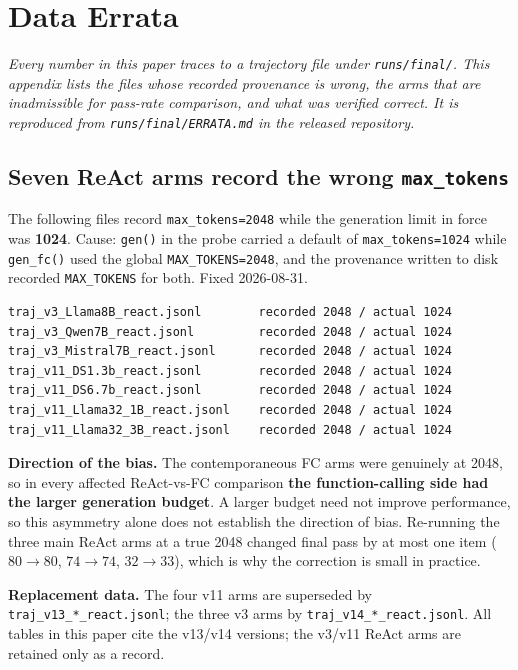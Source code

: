 \section{Data Errata}
\label{app:errata}
\emph{Every number in this paper traces to a trajectory file under
\texttt{runs/final/}. This appendix lists the files whose recorded provenance is wrong, the
arms that are inadmissible for pass-rate comparison, and what was verified correct. It is
reproduced from \texttt{runs/final/ERRATA.md} in the released repository.}

\subsection{Seven ReAct arms record the wrong \texttt{max\_tokens}}

The following files record \texttt{max\_tokens=2048} while the generation limit in force
was \textbf{1024}. Cause: \texttt{gen()} in the probe carried a default of
\texttt{max\_\allowbreak tokens=1024} while \texttt{gen\_fc()} used the global \texttt{MAX\_TOKENS=2048},
and the provenance written to disk recorded \texttt{MAX\_TOKENS} for both. Fixed
2026-08-31.

{\footnotesize
\begin{verbatim}
traj_v3_Llama8B_react.jsonl        recorded 2048 / actual 1024
traj_v3_Qwen7B_react.jsonl         recorded 2048 / actual 1024
traj_v3_Mistral7B_react.jsonl      recorded 2048 / actual 1024
traj_v11_DS1.3b_react.jsonl        recorded 2048 / actual 1024
traj_v11_DS6.7b_react.jsonl        recorded 2048 / actual 1024
traj_v11_Llama32_1B_react.jsonl    recorded 2048 / actual 1024
traj_v11_Llama32_3B_react.jsonl    recorded 2048 / actual 1024
\end{verbatim}
}

\textbf{Direction of the bias.} The contemporaneous FC arms were genuinely at 2048, so in
every affected ReAct-vs-FC comparison \textbf{the function-calling side had the larger
generation budget}. A larger budget need not improve performance, so this asymmetry alone
does not establish the direction of bias. Re-running the three
main ReAct arms at a true 2048 changed final pass by at most one item
($80\to80$, $74\to74$, $32\to33$), which is why the correction is small in practice.

\textbf{Replacement data.} The four v11 arms are superseded by
\texttt{traj\_v13\_*\_react.jsonl}; the three v3 arms by \texttt{traj\_v14\_*\_react.jsonl}.
All tables in this paper cite the v13/v14 versions; the v3/v11 ReAct arms are retained only
as a record.

